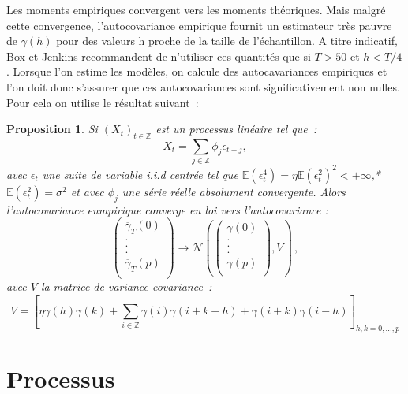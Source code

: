 \documentclass[11pt]{scrartcl} %
\newtheorem{pro}[theorem]{Proposition}
\newcommand{\Xt}{\left(X_t\right)_{t\in\mathbb{Z}}}
\begin{document}
Les moments empiriques convergent vers les moments théoriques. Mais malgré cette convergence, l'autocovariance empirique fournit un estimateur très pauvre de $\gamma(h)$ pour des valeurs h proche de la taille de l'échantillon. A titre indicatif, Box et Jenkins recommandent de n'utiliser ces quantités que si $T>50$ et $h<T/4$.
Lorsque l'on estime les modèles, on calcule des autocavariances empiriques et l'on doit donc s'assurer que ces autocovariances sont significativement non nulles. Pour cela on utilise le résultat suivant~:
\begin{pro}
Si $\Xt$ est un processus linéaire tel que~:
$$
X_t = \sum_{j\in \mathbb{Z}}\phi_j\epsilon_{t-j},
$$
avec $\epsilon_t$ une suite de variable i.i.d centrée tel que $\mathbb{E}\left(\epsilon_t^4\right) = \eta\mathbb{E}\left(\epsilon_t^2\right)^2<+\infty$,* $\mathbb{E}\left(\epsilon_t^2\right)=\sigma^2$ et avec $\phi_j$ une série réelle absolument convergente. Alors l'autocovariance enmpirique converge en loi vers l'autocovariance :
$$
\left(\begin{array}{c}
\overline{\gamma}_T(0)\\
.\\
.\\
.\\
\overline{\gamma}_T(p)\\
\end{array}\right)\rightarrow
 \mathcal{N}\left(
\left(\begin{array}{c}
\gamma(0)\\
.\\
.\\
.\\
\gamma(p)\\
\end{array}\right),V\right)\,,
$$
avec $V$ la matrice de variance covariance~:
$$
V=\left[\eta\gamma(h)\gamma(k)+\sum_{i\in\mathbb{Z}}\gamma(i)\gamma(i+k-h)+\gamma(i+k)\gamma(i-h)\right]_{h,k=0,...,p}
$$
\end{pro}
\section{Processus}
\end{document}
